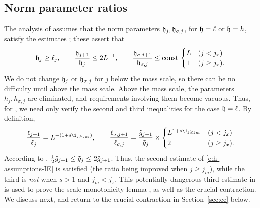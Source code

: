 
\subsection{Norm parameter ratios}
\label{sec:norm-parameter-ratios}

The analysis of \cite{BS-rg-IE} assumes that the norm parameters $\mathfrak{h}_j,\mathfrak{h}_{\sigma,j}$,
for $\mathfrak{h} = \ell$ or $\mathfrak{h} = h$,
satisfy the estimates \cite[\eqref{IE-e:h-assumptions}]{BS-rg-IE}; these assert that
\begin{equation}
\label{e:h-assumptions-IE}
\mathfrak{h}_j \ge \ell_{j},
	\qquad
\frac{\mathfrak{h}_{j+1}}{\mathfrak{h}_j} \le 2 L^{-1},
	\qquad
\frac{\mathfrak{h}_{\sigma,j+1}}{\mathfrak{h}_{\sigma,j}}
	\le
{\rm const}\,
\begin{cases}
L & (j < j_{x}) \\
1 & (j \ge j_{x}).
\end{cases}
\end{equation}
We do not change $\mathfrak{h}_j$ or $\mathfrak{h}_{\sigma,j}$ for $j$ below the mass scale, so there
can be no difficulty until above the mass scale.  Above the mass scale, the parameters
$h_j,h_{\sigma,j}$ are eliminated, and requirements involving them become vacuous.
Thus, for , we need only verify the second and third
inequalities for the case $\mathfrak{h}=\ell$.
By definition,
\begin{equation}\label{e:h-assumptions}
\frac{\ell_{j+1}}{\ell_j} = L^{-(1 + s \1_{j \geq j_m})},
\qquad
\frac{\ell_{\sigma, j+1}}{\ell_{\sigma,j}} = \frac{\ggen_{j+1}}{\ggen_j}
\times
\begin{cases} L^{1 + s \1_{j \geq j_m}} & (j < j_x) \\ 2 & (j \geq j_x). \end{cases}
\end{equation}
According to \cite[\eqref{IE-e:gbarmono}]{BS-rg-IE},
$\frac 12 \tilde{g}_{j+1} \le \tilde{g}_j \le 2 \tilde{g}_{j+1}$.
Thus, the second estimate of \eqref{e:h-assumptions-IE}
is satisfied (the ratio being improved when $j\ge j_m$),
while the third is \emph{not} when $s > 1$ and $j_m < j_x$.
This potentially dangerous third
estimate in  is used to prove the scale monotonicity lemma
\cite[Lemma \ref{IE-lem:Imono}]{BS-rg-IE}, as well
as the crucial contraction.
We discuss
\cite[Lemma \ref{IE-lem:Imono}]{BS-rg-IE} next, and return to the crucial contraction
in Section~\ref{sec:cc} below.

